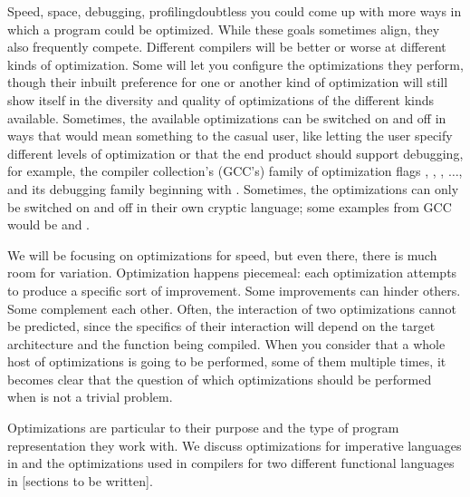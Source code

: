 Speed, space, debugging, profiling\empause doubtless you could come up with more ways in which a program could be optimized. While these goals sometimes align, they also frequently compete. Different compilers will be better or worse at different kinds of optimization. Some will let you configure the optimizations they perform, though their inbuilt preference for one or another kind of optimization will still show itself in the diversity and quality of optimizations of the different kinds available. Sometimes, the available optimizations can be switched on and off in ways that would mean something to the casual user, like letting the user specify different levels of optimization or that the end product should support debugging, for example, the  compiler collection's (GCC's) family of optimization flags , , , $\dotsc$,  and its debugging family beginning with . Sometimes, the optimizations can only be switched on and off in their own cryptic language; some examples from GCC would be  and .

We will be focusing on optimizations for speed, but even there, there is much room for variation. Optimization happens piecemeal: each optimization attempts to produce a specific sort of improvement. Some improvements can hinder others. Some complement each other. Often, the interaction of two optimizations cannot be predicted, since the specifics of their interaction will depend on the target architecture and the function being compiled. When you consider that a whole host of optimizations is going to be performed, some of them multiple times, it becomes clear that the question of which optimizations should be performed when is not a trivial problem.\label{background:compilers:middle-end:phase-ordering}

Optimizations are particular to their purpose and the type of program representation they work with. We discuss optimizations for imperative languages in  and the optimizations used in compilers for two different functional languages in [sections to be written].%
